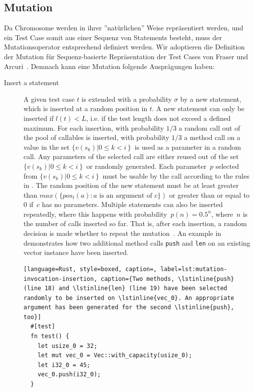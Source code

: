 \documentclass[paper=a4,%
  twoside,%
  BCOR4mm,%
  abstract=true,%
  toc=bibliography,%
  chapterprefix=true,%
  toc=bibliographynumbered,%
  open=right,%
  english,%
  pagesize=pdftex]{scrreprt}
\begin{document}
\subsection{Mutation}
Da Chromosome werden in ihrer ''natürlichen'' Weise repräsentiert werden, und ein Test Case somit aus einer Sequenz von Statements besteht, muss der Mutationsoperator entsprechend definiert werden. Wir adoptieren die Definition der Mutation für Sequenz-basierte Repräsentation der Test Cases von Fraser und Arcuri~\cite{Fraser2012}. Demnach kann eine Mutation folgende Ausprägungen haben:
\begin{description}
  \item[Insert a statement] A given test case $t$ is extended with a probability $\sigma$ by a new statement, which is inserted at a random position in $t$. A new statement can only be inserted if $l(t) < L$, i.e. if the test length does not exceed a defined maximum. For each insertion, with probability $1/3$ a random call out of the pool of callables is inserted, with probability $1/3$ a method call on a value in the set $\{v(s_k) \left| 0 \leq k < i \right\}$ is used as a parameter in a random call. Any parameters of the selected call are either reused out of the set $\{v(s_k) \left| 0 \leq k < i \right\}$ or randomly generated. Each parameter~$p$ selected from $\{v(s_k) \left| 0 \leq k < i \right\}$ must be usable by the call according to the rules in . The random position of the new statement must be at least greater than $max(\{pos_t(a) : a \text{ is an argument of } c\})$ or greater than or equal to $0$ if~$c$ has no parameters. Multiple statements can also be inserted repeatedly, where this happens with probability~$p(n) = 0.5^n$, where~$n$ is the number of calls inserted so far. That is, after each insertion, a random decision is made whether to repeat the mutation~\cite{Tonella2004}. An example in  demonstrates how two additional method calls \lstinline{push} and \lstinline{len} on an existing vector instance have been inserted. 

  \begin{lstlisting}[language=Rust, style=boxed, caption=, label=lst:mutation-invocation-insertion, caption={Two methods, \lstinline{push} (line 18) and \lstinline{len} (line 19) have been selected randomly to be inserted on \lstinline{vec_0}. An appropriate argument has been generated for the second \lstinline{push}, too}]
  #[test]
  fn test() {
    let usize_0 = 32;
    let mut vec_0 = Vec::with_capacity(usize_0);
    let i32_0 = 45;
    vec_0.push(i32_0);
  }


\end{lstlisting}
\end{description}
\end{document}

